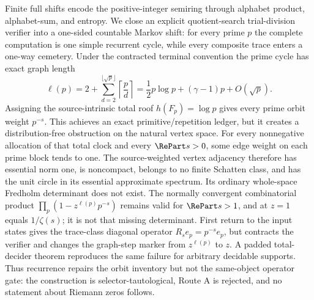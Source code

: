 Finite full shifts encode the positive-integer semiring through alphabet
product, alphabet-sum, and entropy.  We close an explicit quotient-search
trial-division verifier into a one-sided countable Markov shift: for every
prime $p$ the complete computation is one simple recurrent cycle, while
every composite trace enters a one-way cemetery.  Under the contracted
terminal convention the prime cycle has exact graph length
\[
\ell(p)=2+\sum_{d=2}^{\lfloor\sqrt p\rfloor}\left\lceil\frac pd\right\rceil
=\frac12p\log p+(\gamma-1)p+O(\sqrt p).
\]
Assigning the source-intrinsic total roof $h(F_p)=\log p$ gives every prime
orbit weight $p^{-s}$.  This achieves an exact primitive/repetition ledger,
but it creates a distribution-free obstruction on the natural vertex space.
For every nonnegative allocation of that total clock and every
$\RePart s>0$, some edge weight on each prime block tends to one.  The
source-weighted vertex adjacency therefore has essential norm one, is
noncompact, belongs to no finite Schatten class, and has the unit circle in
its essential approximate spectrum.  Its ordinary whole-space Fredholm
determinant does not exist.  The normally convergent combinatorial product
$\prod_p(1-z^{\ell(p)}p^{-s})$ remains valid for $\RePart s>1$, and at
$z=1$ equals $1/\zeta(s)$; it is not that missing determinant.  First return
to the input states gives the trace-class diagonal operator
$R_s e_p=p^{-s}e_p$, but contracts the verifier and changes the graph-step
marker from $z^{\ell(p)}$ to $z$.  A padded total-decider theorem reproduces
the same failure for arbitrary decidable supports.  Thus recurrence repairs
the orbit inventory but not the same-object operator gate: the construction
is selector-tautological, Route A is rejected, and no statement about
Riemann zeros follows.
